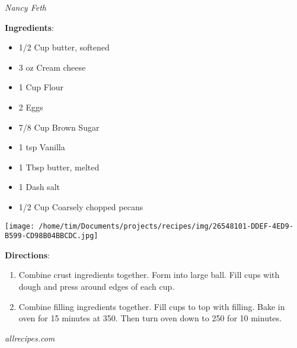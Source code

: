 \documentclass[11pt, twoside, openany]{book}
\begin{document}
 \label{pecan-tassies}\hfill\textit{Nancy Feth}\\
\begin{minipage}[t]{0.8\linewidth}
\textbf{Ingredients}:\vspace{-3mm}
\begin{multicols}{2}
\begin{itemize}\setlength\itemsep{-1mm}
\item 1/2 Cup butter, softened
\item 3 oz Cream cheese
\item 1 Cup Flour
\item 2 Eggs
\item 7/8 Cup Brown Sugar
\item 1 tsp Vanilla
\item 1 Tbsp butter, melted
\item 1 Dash salt
\item 1/2 Cup Coarsely chopped pecans
\end{itemize}
\end{multicols}
\end{minipage}
\begin{minipage}[t]{0.2\linewidth}
\centering \strut\vspace*{-\baselineskip}\newline
\texttt{[image: /home/tim/Documents/projects/recipes/img/26548101-DDEF-4ED9-B599-CD98B04BBCDC.jpg]}\\
\end{minipage}\vspace{3mm}
\textbf{Directions}:
\vspace{-3mm}\begin{enumerate}\setlength\itemsep{-1mm}
\item Combine crust ingredients together. Form into large ball. Fill cups with dough and press around edges of each cup.
\item Combine filling ingredients together. Fill cups to top with filling. Bake in oven for 15 minutes at 350. Then turn oven down to 250 for 10 minutes. 
\end{enumerate}
 \label{quick-chicken-divan}\hfill\textit{allrecipes.com}\\
\end{document}
